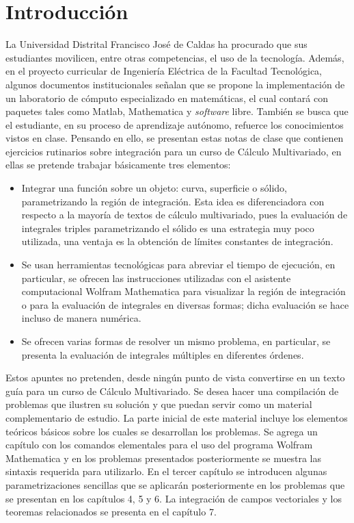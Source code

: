 \chapter*{Introducción}

La Universidad Distrital Francisco José de Caldas ha procurado que sus estudiantes movilicen, entre otras competencias,
el uso de la tecnología. Además, en el proyecto curricular de Ingeniería Eléctrica de la Facultad Tecnológica, algunos documentos institucionales señalan que se propone la implementación de un laboratorio de cómputo especializado en matemáticas, el cual contará con paquetes tales
como Matlab, Mathematica y \emph{software} libre.
También se busca que el estudiante, en su proceso de aprendizaje autónomo, refuerce los conocimientos vistos en clase.
Pensando en ello, se presentan estas notas de clase que contienen ejercicios
rutinarios sobre integración para un curso de Cálculo Multivariado, en ellas se pretende trabajar básicamente tres elementos:
\begin{itemize}
  \item Integrar una función sobre un objeto: curva, superficie o sólido, parametrizando la región de integración.
    Esta idea es diferenciadora con respecto a la mayoría de textos de cálculo multivariado, pues la evaluación de integrales triples parametrizando el sólido es una estrategia muy poco utilizada, una ventaja es la obtención de límites constantes de integración.
  \item Se usan herramientas tecnológicas para abreviar el tiempo de ejecución, en particular, se ofrecen las instrucciones utilizadas con el asistente computacional Wolfram Mathematica para visualizar la región de integración o para la evaluación de integrales en diversas formas; dicha evaluación se hace incluso de manera numérica.
  \item Se ofrecen varias formas de resolver un mismo problema, en particular, se presenta la evaluación de integrales múltiples en diferentes órdenes.
\end{itemize}
Estos apuntes no pretenden, desde ningún punto de vista convertirse en un texto guía para un curso de Cálculo Multivariado.
Se desea hacer una compilación de problemas que ilustren su solución y que puedan servir como un material complementario de estudio.
La parte inicial de este material incluye los elementos teóricos básicos sobre los cuales se desarrollan los problemas.
Se agrega un capítulo con los comandos elementales para el uso del programa Wolfram Mathematica
y en los problemas presentados posteriormente se muestra las sintaxis requerida para utilizarlo.
En el tercer capítulo se introducen algunas parametrizaciones sencillas que se aplicarán posteriormente en los problemas que se
presentan en los capítulos 4, 5 y 6.
La integración de campos vectoriales y los teoremas relacionados se presenta en el capítulo 7.

